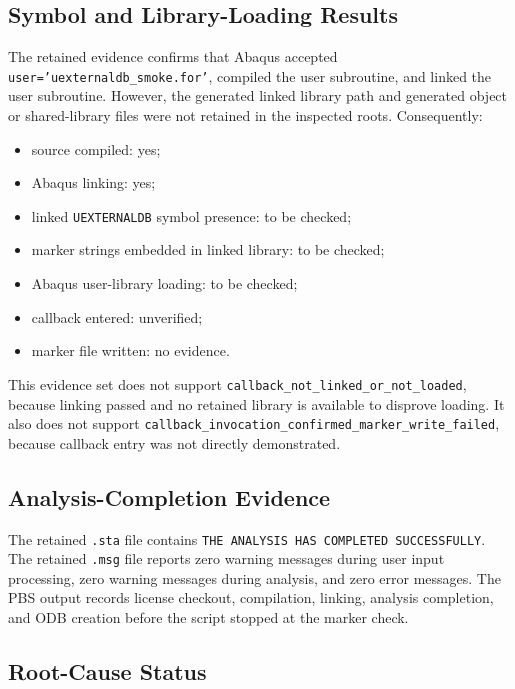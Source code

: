 \documentclass[11pt,a4paper]{article}
\begin{document}
\subsection*{Symbol and Library-Loading Results}

The retained evidence confirms that Abaqus accepted \texttt{user='uexternaldb\_smoke.for'}, compiled the user subroutine, and linked the user subroutine. However, the generated linked library path and generated object or shared-library files were not retained in the inspected roots. Consequently:

\begin{itemize}
  \item source compiled: yes;
  \item Abaqus linking: yes;
  \item linked \texttt{UEXTERNALDB} symbol presence: to be checked;
  \item marker strings embedded in linked library: to be checked;
  \item Abaqus user-library loading: to be checked;
  \item callback entered: unverified;
  \item marker file written: no evidence.
\end{itemize}

This evidence set does not support \texttt{callback\_not\_linked\_or\_not\_loaded}, because linking passed and no retained library is available to disprove loading. It also does not support \texttt{callback\_invocation\_confirmed\_marker\_write\_failed}, because callback entry was not directly demonstrated.

\subsection*{Analysis-Completion Evidence}

The retained \texttt{.sta} file contains \texttt{THE ANALYSIS HAS COMPLETED SUCCESSFULLY}. The retained \texttt{.msg} file reports zero warning messages during user input processing, zero warning messages during analysis, and zero error messages. The PBS output records license checkout, compilation, linking, analysis completion, and ODB creation before the script stopped at the marker check.

\subsection*{Root-Cause Status}
\end{document}
